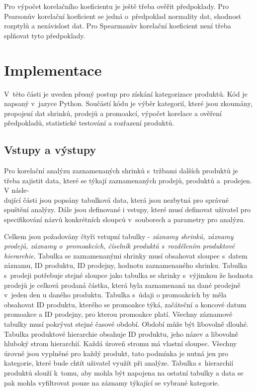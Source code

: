 Pro výpočet korelačního koeficientu je ještě třeba ověřit předpoklady. Pro Pearsonův korelační koeficient se jedná o~předpoklad normality dat, shodnost rozptylů a nezávislost dat. Pro Spearmanův korelační koeficient není třeba splňovat tyto předpoklady.

\section{Implementace}

V~této části je uveden přesný postup pro získání kategorizace produktů. Kód je napsaný v~jazyce Python. Součástí kódu je výběr kategorií, které jsou zkoumány, propojení dat shrinků, prodejů a promoakcí, výpočet korelace a ověření předpokladů, statistické testování a rozřazení produktů.


\subsection{Vstupy a výstupy}
\label{ss:vstupyvystupy}

Pro korelační analýzu zaznamenaných shrinků s~tržbami dalších produktů je třeba zajistit data, které se týkají zaznamenaných prodejů, produktů a~prodejen. V násle-\\dující části jsou popsány tabulková data, která jsou nezbytná pro správné spuštění analýzy. Dále jsou definované i vstupy, které musí definovat uživatel pro specifikování názvů konkrétních sloupců v~souborech a parametry pro analýzu.

Celkem jsou požadovány čtyři vstupní tabulky - \emph{záznamy shrinků, záznamy prodejů, záznamy o~promoakcích, číselník produktů s~rozdělením produktové hierarchie}. %
Tabulka se zaznamenanými shrinky musí obsahovat sloupec s~datem záznamu, ID produktu, ID prodejny, hodnotu zaznamenaného shrinku. Tabulka s~prodeji potřebuje stejné sloupce jako tabulka se shrinky s~výjimkou že hodnota prodejů je celková prodaná částka, která byla zaznamenaná na dané prodejně v~jeden den u daného produktu. Tabulka s~údaji o promoakcích by měla obsahovat ID produktu, kterého se promoakce týká, začáteční a koncové datum promoakce a ID prodejny, pro kterou promoakce platí.
Všechny záznamové tabulky musí pokrývat stejné časové období. Období může být libovolně dlouhé.
Tabulka produktové hierarchie obsahuje ID produktu, jeho název a libovolně hluboký strom hierarchií. Každá úroveň stromu má vlastní sloupec. Všechny úrovně jsou vyplněné pro každý produkt, tato podmínka je nutná jen pro kategorie, které bude chtít uživatel využít při analýze. 
Tabulka s~hierarchií produktů slouží k~tomu, aby mohla být napojena na ostatní tabulky a data se pak mohla vyfiltrovat pouze na záznamy týkající se vybrané kategorie.

